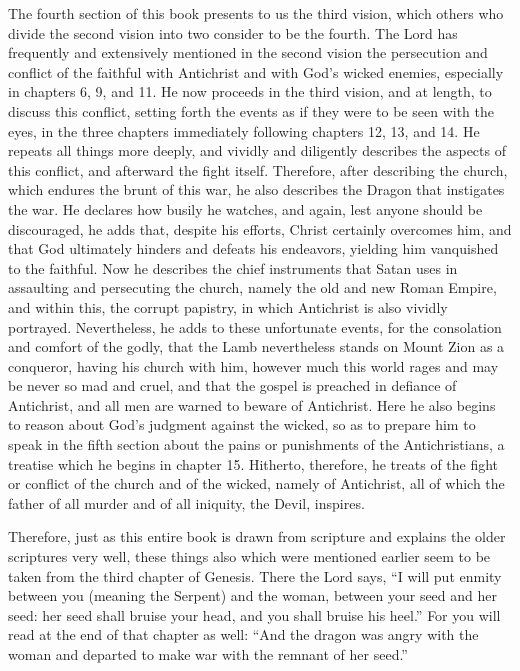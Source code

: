 The fourth section of this book presents to us the third vision, which others who divide the second vision into two consider to be the fourth. The Lord has frequently and extensively mentioned in the second vision the persecution and conflict of the faithful with Antichrist and with God’s wicked enemies, especially in chapters 6, 9, and 11. He now proceeds in the third vision, and at length, to discuss this conflict, setting forth the events as if they were to be seen with the eyes, in the three chapters immediately following chapters 12, 13, and 14. He repeats all things more deeply, and vividly and diligently describes the aspects of this conflict, and afterward the fight itself. Therefore, after describing the church, which endures the brunt of this war, he also describes the Dragon that instigates the war. He declares how busily he watches, and again, lest anyone should be discouraged, he adds that, despite his efforts, Christ certainly overcomes him, and that God ultimately hinders and defeats his endeavors, yielding him vanquished to the faithful. Now he describes the chief instruments that Satan uses in assaulting and persecuting the church, namely the old and new Roman Empire, and within this, the corrupt papistry, in which Antichrist is also vividly portrayed. Nevertheless, he adds to these unfortunate events, for the consolation and comfort of the godly, that the Lamb nevertheless stands on Mount Zion as a conqueror, having his church with him, however much this world rages and may be never so mad and cruel, and that the gospel is preached in defiance of Antichrist, and all men are warned to beware of Antichrist. Here he also begins to reason about God’s judgment against the wicked, so as to prepare him to speak in the fifth section about the pains or punishments of the Antichristians, a treatise which he begins in chapter 15. Hitherto, therefore, he treats of the fight or conflict of the church and of the wicked, namely of Antichrist, all of which the father of all murder and of all iniquity, the Devil, inspires.

Therefore, just as this entire book is drawn from scripture and explains the older scriptures very well, these things also which were mentioned earlier seem to be taken from the third chapter of Genesis. There the Lord says, “I will put enmity between you (meaning the Serpent) and the woman, between your seed and her seed: her seed shall bruise your head, and you shall bruise his heel.” For you will read at the end of that chapter as well: “And the dragon was angry with the woman and departed to make war with the remnant of her seed.”

